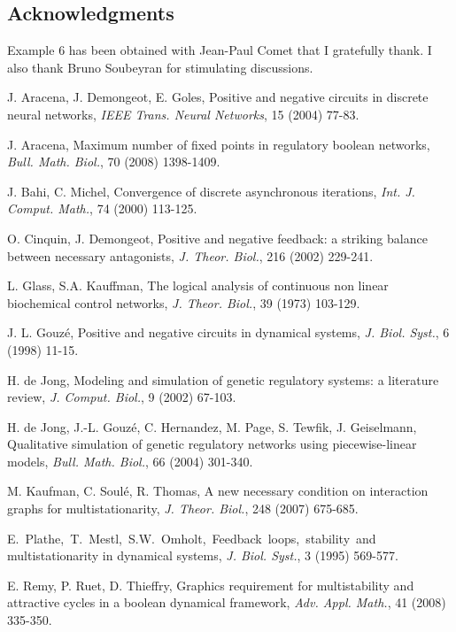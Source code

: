 \documentclass[11pt]{article}
\begin{document}
\begin{center}
{\subsection*{Acknowledgments}}


\noindent
Example 6 has been obtained with Jean-Paul Comet that I gratefully
thank. I also thank Bruno Soubeyran for stimulating discussions.

\begin{thebibliography}{7}

J. Aracena, J. Demongeot, E. Goles, Positive and negative circuits in
discrete neural networks, {\emph{IEEE Trans. Neural
Networks}}, 15 (2004) 77-83.

J. Aracena, Maximum number of fixed points in regulatory boolean
networks, {\emph{Bull. Math. Biol.}}, 70 (2008)
1398-1409.

J. Bahi, C. Michel, Convergence of discrete asynchronous iterations,
{\emph{Int. J. Comput. Math.}}, 74 (2000) 113-125.

O. Cinquin, J. Demongeot, Positive and negative feedback: a striking
balance between necessary antagonists, {\emph{J. Theor. Biol.}}, 216
(2002) 229-241.

L. Glass, S.A. Kauffman, The logical analysis of continuous non linear
biochemical control networks, {\emph{J. Theor. Biol.}},
39 (1973) 103-129.

J. L. Gouz\'e, Positive and negative circuits in dynamical systems,
{\emph{J. Biol. Syst.}}, 6 (1998) 11-15.

H. de Jong, Modeling and simulation of genetic regulatory systems: a
literature review, {\emph{J. Comput. Biol.}}, 9 (2002)
67-103.

H. de Jong, J.-L. Gouz\'e, C. Hernandez, M. Page, S. Tewfik,
J. Geiselmann, Qualitative simulation of genetic regulatory networks
using piecewise-linear models, {\emph{Bull. Math. Biol.}}, 66 (2004) 301-340.

M. Kaufman, C. Soul\'e, R. Thomas, A new necessary condition on
interaction graphs for multistationarity, {\emph{J.
Theor. Biol.}}, 248 (2007) 675-685.

E.~Plathe,~T.~Mestl,~S.W.~Omholt,~Feedback~loops,~stability~and
multistationarity in dynamical systems, {\emph{J. Biol. Syst.}}, 3
(1995) 569-577.

E. Remy, P. Ruet, D. Thieffry, Graphics requirement for multistability
and attractive cycles in a boolean dynamical framework,
{\emph{Adv. Appl. Math.}}, 41 (2008) 335-350.


\end{thebibliography}
\end{center}
\end{document}

